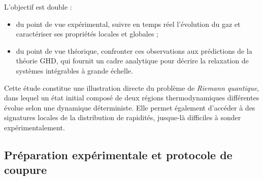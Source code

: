 L’objectif est double :

\begin{itemize}[label = $\bullet$]
	\item du point de vue expérimental, suivre en temps réel l’évolution du gaz et caractériser ses propriétés locales et globales ;
	\item du point de vue théorique, confronter ces observations aux prédictions de la théorie \gls{GHD}, qui fournit un cadre analytique pour décrire la relaxation de systèmes intégrables à grande échelle.
\end{itemize}

Cette étude constitue une illustration directe du problème de \emph{Riemann quantique}, dans lequel un état initial composé de deux régions thermodynamiques différentes évolue selon une dynamique déterministe. Elle permet également d’accéder à des signatures locales de la distribution de rapidités, jusque-là difficiles à sonder expérimentalement.

\medskip



\subsection{Préparation expérimentale et protocole de coupure}
\label{chap6:sec.propcol}



